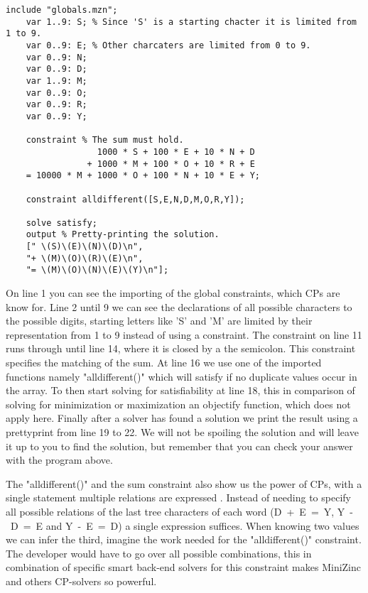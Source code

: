 \label{lst:SendMoreMoney}
\begin{lstlisting}[language=minizinc, caption={Solution to the puzzle "send more money" slightly modified from \url{https://www.minizinc.org/doc-2.5.5/en/downloads/send-more-money.mzn}}]
	include "globals.mzn";
	var 1..9: S; % Since 'S' is a starting chacter it is limited from 1 to 9.
	var 0..9: E; % Other charcaters are limited from 0 to 9.
	var 0..9: N;
	var 0..9: D;
	var 1..9: M;
	var 0..9: O;
	var 0..9: R;
	var 0..9: Y;
	
	constraint % The sum must hold.
	              1000 * S + 100 * E + 10 * N + D
	            + 1000 * M + 100 * O + 10 * R + E
	= 10000 * M + 1000 * O + 100 * N + 10 * E + Y;
	
	constraint alldifferent([S,E,N,D,M,O,R,Y]);
	
	solve satisfy;
	output % Pretty-printing the solution.
	[" \(S)\(E)\(N)\(D)\n",
	"+ \(M)\(O)\(R)\(E)\n",
	"= \(M)\(O)\(N)\(E)\(Y)\n"];
\end{lstlisting}
\label{sendMoreMoneyExplanation}
On line 1 you can see the importing of the global constraints, which CPs are know for. Line 2 until 9 we can see the declarations of all possible characters to the possible digits, starting letters like 'S' and 'M' are limited by their representation from 1 to 9 instead of using a constraint. The constraint on line 11 runs through until line 14, where it is closed by a the semicolon. This constraint specifies the matching of the sum. At line 16 we use one of the imported functions namely "alldifferent()" which will satisfy if no duplicate values occur in the array. To then start solving for satisfiability at line 18, this in comparison of solving for minimization or maximization an objectify function, which does not apply here. Finally after a solver has found a solution we print the result using a prettyprint from line 19 to 22.
We will not be spoiling the solution and will leave it up to you to find the solution, but remember that you can check your answer with the program above.

The "alldifferent()" and the sum constraint also show us the power of CPs, with a single statement multiple relations are expressed \cite{53marriott1998programming}. Instead of needing to specify all possible relations of the last tree characters of each word (\mbox{D + E = Y}, \mbox{Y - D = E} and \mbox{Y - E = D}) a single expression suffices. When knowing two values we can infer the third, imagine the work needed for the "alldifferent()" constraint. The developer would have to go over all possible combinations, this in combination of specific smart back-end solvers for this constraint makes MiniZinc and others CP-solvers so powerful. 

